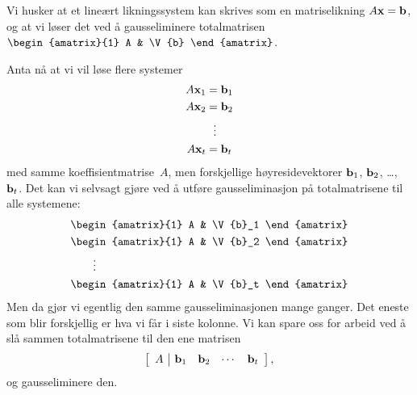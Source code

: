 Vi husker at et lineært likningssystem kan skrives som en
matriselikning $A \mathbf{x} = \mathbf{b}$, og at vi løser det ved å
gausseliminere totalmatrisen
$\begin{amatrix}{1} A & \V{b} \end{amatrix}$.

Anta nå at vi vil løse flere systemer
\begin{align*}
A \mathbf{x}_1 &= \mathbf{b}_1 \\
A \mathbf{x}_2 &= \mathbf{b}_2 \\
          &\ \ \vdots \\
A \mathbf{x}_t &= \mathbf{b}_t
\end{align*}
med samme koeffisientmatrise~$A$, men forskjellige høyresidevektorer
$\mathbf{b}_1$, $\mathbf{b}_2$, \ldots, $\mathbf{b}_t$.  Det kan vi selvsagt gjøre
ved å utføre gausseliminasjon på totalmatrisene til alle systemene:
\begin{align*}
& \begin{amatrix}{1} A & \V{b}_1 \end{amatrix} \\
& \begin{amatrix}{1} A & \V{b}_2 \end{amatrix} \\
& \qquad\vdots \\
& \begin{amatrix}{1} A & \V{b}_t \end{amatrix}
\end{align*}
Men da gjør vi egentlig den samme gausseliminasjonen mange ganger.
Det eneste som blir forskjellig er hva vi får i siste kolonne.  Vi kan
spare oss for arbeid ved å slå sammen totalmatrisene til den ene
matrisen
\[
\left[
\begin{array}{c|cccc} A & \mathbf{b}_1 & \mathbf{b}_2 & \cdots & \mathbf{b}_t \end{array}
\right],
\]
og gausseliminere den.

